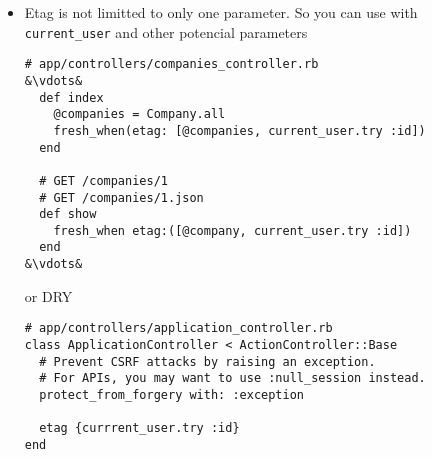 \documentclass{beamer}
\newcommand{\outputcommand}[1]{\color{darkgreen}{#1}}
\begin{document}
\begin{frame}
\begin{itemize}
\begin{itemize}
\item With the parameter \texttt{-b cookies.txt}, curls sends the cookies to the web server. We should get the same etag
\lstset{language=shell}
\begin{lstlisting}[escapechar=!]
$ curl -I http://localhost:3000/companies -b cookies.txt
!\outputcommand{HTTP/1.1 200 OK\\
[\dots]\\
Etag: "3f5571a88b47b9cd72b820d7678374b8"\\
}!
\end{lstlisting}

\item Use the etag to find out in the request with \texttt{If-None-Match} if the version which was cached is still up to date
\lstset{language=shell}
\begin{lstlisting}[escapechar=!]
$ curl -I http://localhost:3000/companies -b cookies.txt --header 'If-None-Match: "3f5571a88b47b9cd72b820d7678374b8"'
!\outputcommand{HTTP/1.1 {\color{red}304 Not Modified}\\
[\dots]\\
Etag: "3f5571a88b47b9cd72b820d7678374b8"\\
}!
\end{lstlisting}
\end{itemize}

\item Etag is not limitted to only one parameter. So you can  use with \texttt{current\_user} and other potencial parameters

\lstset{language=Ruby, style=eclipse}
\begin{lstlisting}[escapechar=&]
# app/controllers/companies_controller.rb
&\vdots&
  def index
    @companies = Company.all
    fresh_when(etag: [@companies, current_user.try :id])
  end

  # GET /companies/1
  # GET /companies/1.json
  def show
    fresh_when etag:([@company, current_user.try :id])
  end
&\vdots&
\end{lstlisting}

or DRY 

\lstset{language=Ruby, style=eclipse}
\begin{lstlisting}[escapechar=&]
# app/controllers/application_controller.rb
class ApplicationController < ActionController::Base
  # Prevent CSRF attacks by raising an exception.
  # For APIs, you may want to use :null_session instead.
  protect_from_forgery with: :exception

  etag {currrent_user.try :id}
end
\end{lstlisting}
\end{itemize}

\end{frame}
\end{document}
